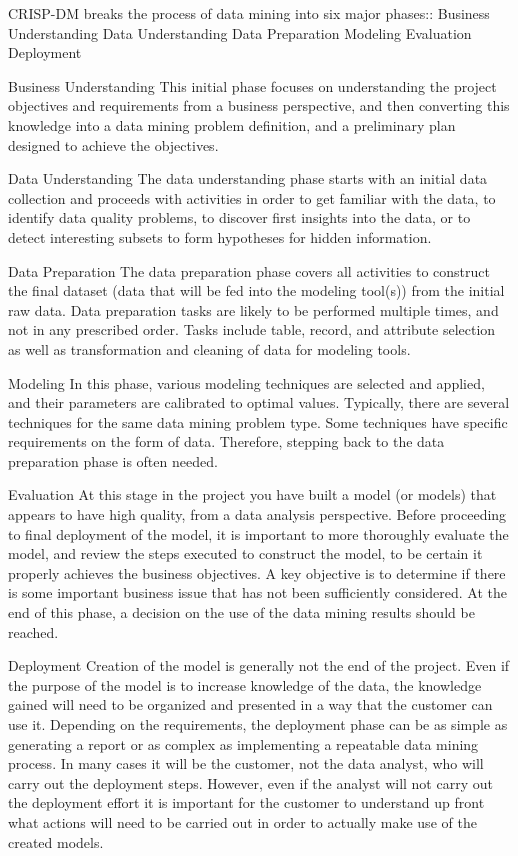 CRISP-DM breaks the process of data mining into six major phases::
Business Understanding
Data Understanding
Data Preparation
Modeling
Evaluation
Deployment

Business Understanding
This initial phase focuses on understanding the project objectives and requirements from a business perspective, and then converting this knowledge into a data mining problem definition, and a preliminary plan designed to achieve the objectives.

Data Understanding
The data understanding phase starts with an initial data collection and proceeds with activities in order to get familiar with the data, to identify data quality problems, to discover first insights into the data, or to detect interesting subsets to form hypotheses for hidden information.

Data Preparation
The data preparation phase covers all activities to construct the final dataset (data that will be fed into the modeling tool(s)) from the initial raw data. Data preparation tasks are likely to be performed multiple times, and not in any prescribed order. Tasks include table, record, and attribute selection as well as transformation and cleaning of data for modeling tools.

Modeling
In this phase, various modeling techniques are selected and applied, and their parameters are calibrated to optimal values. Typically, there are several techniques for the same data mining problem type. Some techniques have specific requirements on the form of data. Therefore, stepping back to the data preparation phase is often needed.

Evaluation
At this stage in the project you have built a model (or models) that appears to have high quality, from a data analysis perspective. Before proceeding to final deployment of the model, it is important to more thoroughly evaluate the model, and review the steps executed to construct the model, to be certain it properly achieves the business objectives. A key objective is to determine if there is some important business issue that has not been sufficiently considered. At the end of this phase, a decision on the use of the data mining results should be reached.

Deployment
Creation of the model is generally not the end of the project. Even if the purpose of the model is to increase knowledge of the data, the knowledge gained will need to be organized and presented in a way that the customer can use it. Depending on the requirements, the deployment phase can be as simple as generating a report or as complex as implementing a repeatable data mining process. In many cases it will be the customer, not the data analyst, who will carry out the deployment steps. However, even if the analyst will not carry out the deployment effort it is important for the customer to understand up front what actions will need to be carried out in order to actually make use of the created models.


